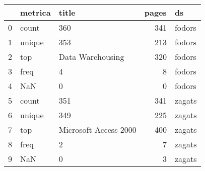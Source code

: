\begin{tabular}{lllrl}
\toprule
{} & metrica &                  title &  pages &      ds \\
\midrule
0 &   count &                    360 &    341 &  fodors \\
1 &  unique &                    353 &    213 &  fodors \\
2 &     top &       Data Warehousing &    320 &  fodors \\
3 &    freq &                      4 &      8 &  fodors \\
4 &     NaN &                      0 &      0 &  fodors \\
5 &   count &                    351 &    341 &  zagats \\
6 &  unique &                    349 &    225 &  zagats \\
7 &     top &  Microsoft Access 2000 &    400 &  zagats \\
8 &    freq &                      2 &      7 &  zagats \\
9 &     NaN &                      0 &      3 &  zagats \\
\bottomrule
\end{tabular}

